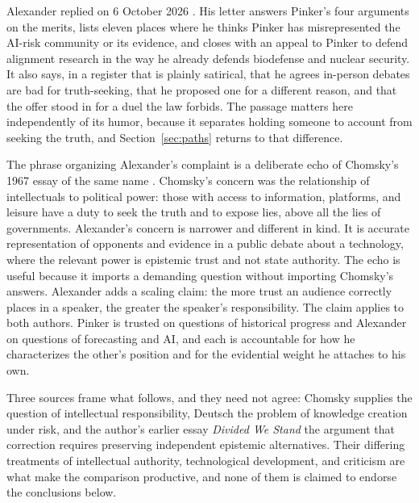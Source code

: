\documentclass[11pt]{article}
\begin{document}
Alexander replied on 6 October 2026 \cite{alexander2026}. His letter answers Pinker's four arguments on the merits, lists eleven places where he thinks Pinker has misrepresented the AI-risk community or its evidence, and closes with an appeal to Pinker to defend alignment research in the way he already defends biodefense and nuclear security. It also says, in a register that is plainly satirical, that he agrees in-person debates are bad for truth-seeking, that he proposed one for a different reason, and that the offer stood in for a duel the law forbids. The passage matters here independently of its humor, because it separates holding someone to account from seeking the truth, and Section~\ref{sec:paths} returns to that difference.

The phrase organizing Alexander's complaint is a deliberate echo of Chomsky's 1967 essay of the same name \cite{chomsky1967}. Chomsky's concern was the relationship of intellectuals to political power: those with access to information, platforms, and leisure have a duty to seek the truth and to expose lies, above all the lies of governments. Alexander's concern is narrower and different in kind. It is accurate representation of opponents and evidence in a public debate about a technology, where the relevant power is epistemic trust and not state authority. The echo is useful because it imports a demanding question without importing Chomsky's answers. Alexander adds a scaling claim: the more trust an audience correctly places in a speaker, the greater the speaker's responsibility. The claim applies to both authors. Pinker is trusted on questions of historical progress and Alexander on questions of forecasting and AI, and each is accountable for how he characterizes the other's position and for the evidential weight he attaches to his own.

Three sources frame what follows, and they need not agree: Chomsky supplies the question of intellectual responsibility, Deutsch the problem of knowledge creation under risk, and the author's earlier essay \emph{Divided We Stand} the argument that correction requires preserving independent epistemic alternatives. Their differing treatments of intellectual authority, technological development, and criticism are what make the comparison productive, and none of them is claimed to endorse the conclusions below.
\end{document}
